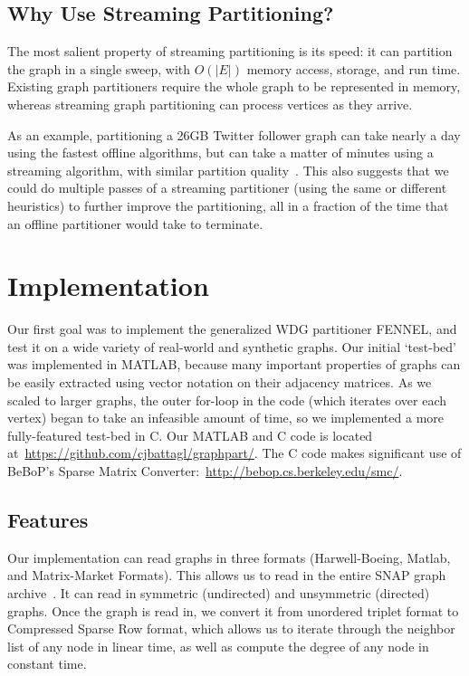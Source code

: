 \documentclass[11pt]{article}
\begin{document}
\subsection{Why Use Streaming Partitioning?}
The most salient property of streaming partitioning is its speed: it can partition the graph in a single sweep, with $O(|E|)$ memory access, storage, and run time. Existing graph partitioners require the whole graph to be represented in memory, whereas streaming graph partitioning can process vertices as they arrive.

As an example, partitioning a 26GB Twitter follower graph can take nearly a day using the fastest offline algorithms, but can take a matter of minutes using a streaming algorithm, with similar partition quality~\cite{tsourakakis2012fennel}. This also suggests that we could do multiple passes of a streaming partitioner (using the same or different heuristics) to further improve the partitioning, all in a fraction of the time that an offline partitioner would take to terminate. 

\section{Implementation}
Our first goal was to implement the generalized WDG partitioner FENNEL, and test it on a wide variety of real-world and synthetic graphs. Our initial `test-bed' was implemented in MATLAB, because many important properties of graphs can be easily extracted using vector notation on their adjacency matrices. As we scaled to larger graphs, the outer for-loop in the code (which iterates over each vertex) began to take an infeasible amount of time, so we implemented a more fully-featured test-bed in C. Our MATLAB and C code is located at~\url{https://github.com/cjbattagl/graphpart/}. The C code makes significant use of BeBoP's Sparse Matrix Converter:~\url{http://bebop.cs.berkeley.edu/smc/}.

\subsection{Features}
Our implementation can read graphs in three formats (Harwell-Boeing, Matlab, and Matrix-Market Formats). This allows us to read in the entire SNAP graph archive~\cite{Leskovec-data}. It can read in symmetric (undirected) and unsymmetric (directed) graphs. Once the graph is read in, we convert it from unordered triplet format to Compressed Sparse Row format, which allows us to iterate through the neighbor list of any node in linear time, as well as compute the degree of any node in constant time.
\end{document}
